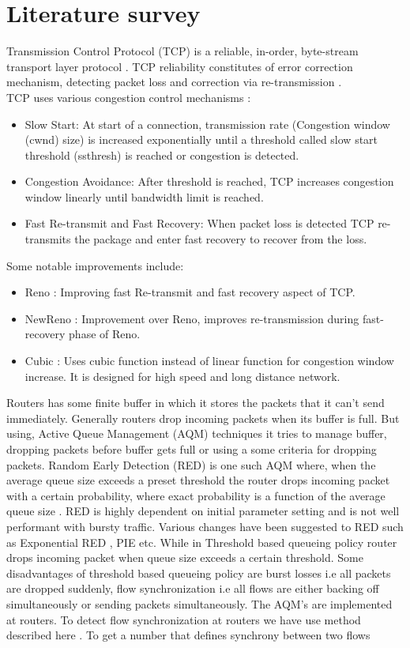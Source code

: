 \section{Literature survey}
Transmission Control Protocol (TCP) is a reliable, in-order, byte-stream transport layer protocol \cite{rfc9293}. TCP reliability constitutes of error correction mechanism, detecting packet loss and correction via re-transmission \cite{rfc9293}. \\
TCP uses various congestion control mechanisms \cite{rfc5681} :
\begin{itemize}
    \item Slow Start: At start of a connection, transmission rate (Congestion window (cwnd) size) is increased exponentially until a threshold called slow start threshold (ssthresh) is reached or congestion is detected.
    \item Congestion Avoidance: After threshold is reached, TCP increases congestion window linearly
until bandwidth limit is reached.
    \item Fast Re-transmit and Fast Recovery: When packet loss is detected TCP re-transmits the package
and enter fast recovery to recover from the loss.
\end{itemize}
Some notable improvements include:
\begin{itemize}
    \item Reno \cite{rfc5681}: Improving fast Re-transmit and fast recovery aspect of TCP.
    \item NewReno \cite{rfc6582}: Improvement over Reno, improves re-transmission during fast-recovery phase of Reno. 
    \item Cubic \cite{rfc9438}: Uses cubic function instead of linear function for congestion window increase. It is designed for high speed and long distance network.
\end{itemize}
Routers has some finite buffer in which it stores the packets that it can't send immediately. Generally routers drop incoming packets when its buffer is full. But using, Active Queue Management (AQM) techniques it tries to manage buffer, dropping packets before buffer gets full or using a some criteria for dropping packets\cite{bachl22}. Random Early Detection (RED) is one such AQM where, when the average queue size exceeds a preset threshold the router drops incoming packet with a certain probability, where exact probability is a function of the average queue size \cite{floyd93}. RED is highly dependent on initial parameter setting and is not well performant with bursty traffic. Various changes have been suggested to RED such as Exponential RED \cite{shao05}, PIE \cite{pan13} etc. While in Threshold based queueing policy router drops incoming packet when queue size exceeds a certain threshold. Some disadvantages of threshold based queueing policy are burst losses i.e all packets are dropped suddenly, flow synchronization i.e all flows are either backing off simultaneously or sending packets simultaneously.
The AQM's are implemented at routers. To detect flow synchronization at routers we have use method described here \cite{hass08}. To get a number that defines synchrony between two flows %

